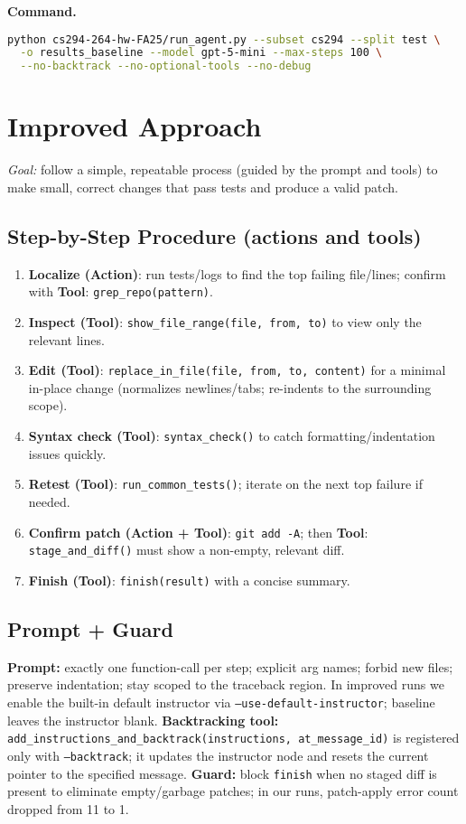 \documentclass[11pt]{article}
\begin{document}
\noindent \textbf{Command.}
\begin{lstlisting}[style=code,language=bash]
python cs294-264-hw-FA25/run_agent.py --subset cs294 --split test \
  -o results_baseline --model gpt-5-mini --max-steps 100 \
  --no-backtrack --no-optional-tools --no-debug
\end{lstlisting}

\section*{Improved Approach}
\emph{Goal:} follow a simple, repeatable process (guided by the prompt and tools) to make small, correct changes that pass tests and produce a valid patch.

\subsection*{Step-by-Step Procedure (actions and tools)}
\begin{enumerate}
  \item \textbf{Localize (Action)}: run tests/logs to find the top failing file/lines; confirm with \textbf{Tool}: \texttt{grep\_repo(pattern)}.
  \item \textbf{Inspect (Tool)}: \texttt{show\_file\_range(file, from, to)} to view only the relevant lines.
  \item \textbf{Edit (Tool)}: \texttt{replace\_in\_file(file, from, to, content)} for a minimal in-place change (normalizes newlines/tabs; re-indents to the surrounding scope).
  \item \textbf{Syntax check (Tool)}: \texttt{syntax\_check()} to catch formatting/indentation issues quickly.
  \item \textbf{Retest (Tool)}: \texttt{run\_common\_tests()}; iterate on the next top failure if needed.
  \item \textbf{Confirm patch (Action + Tool)}: \texttt{git add -A}; then \textbf{Tool}: \texttt{stage\_and\_diff()} must show a non-empty, relevant diff.
  \item \textbf{Finish (Tool)}: \texttt{finish(result)} with a concise summary.
\end{enumerate}

\subsection*{Prompt + Guard}
\textbf{Prompt:} exactly one function-call per step; explicit arg names; forbid new files; preserve indentation; stay scoped to the traceback region. In improved runs we enable the built-in default instructor via \texttt{--use-default-instructor}; baseline leaves the instructor blank.\newline
\textbf{Backtracking tool:} \texttt{add\_instructions\_and\_backtrack(instructions, at\_message\_id)} is registered only with \texttt{--backtrack}; it updates the instructor node and resets the current pointer to the specified message.\newline
\textbf{Guard:} block \texttt{finish} when no staged diff is present to eliminate empty/garbage patches; in our runs, patch-apply error count dropped from 11 to 1.
\end{document}
